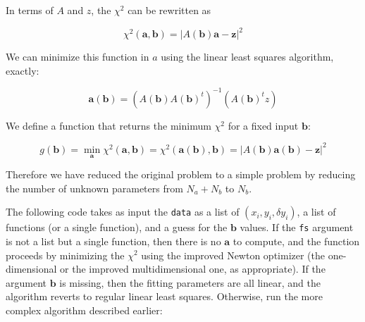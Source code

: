 \documentclass[justified,sixbynine]{tufte-book}
\def\ft{\small\tt}
\theoremstyle{plain}%
\theoremstyle{definition}
\theoremstyle{remark}
\begin{document}
\begin{fullwidth}
In terms of $A$ and $z$, the $\chi^2$ can be rewritten as

\begin{equation}
\chi^2(\mathbf{a},\mathbf{b}) = \left| A(\mathbf{b}) \mathbf{a} - \mathbf{z} \right|^2
\end{equation}

We can minimize this function in $a$ using the linear least squares algorithm, exactly:

\begin{equation}
\mathbf{a}(\mathbf{b}) = (A(\mathbf{b}) A(\mathbf{b})^t)^{-1}(A(\mathbf{b})^t z)
\end{equation}

We define a function that returns the minimum $\chi^2$ for a fixed input $\mathbf{b}$:

\begin{equation}
g(\mathbf{b}) =
\min_{\mathbf{a}}
\chi^2(\mathbf{a},\mathbf{b}) =
\chi^2(\mathbf{a}(\mathbf{b}),\mathbf{b}) = \left|
A(\mathbf{b})\mathbf{a}(\mathbf{b}) - \mathbf{z}
\right|^2
\end{equation}

Therefore we have reduced the original problem to a simple problem by reducing the number of unknown parameters from $N_a+N_b$ to $N_b$.

The following code takes as input the {\ft data} as a list of $(x_i,y_i,\delta y_i)$, a list of functions (or a single function), and a guess for the $\mathbf{b}$ values. If the {\ft fs} argument is not a list but a single function, then there is no $\mathbf{a}$ to compute, and the function proceeds by minimizing the $\chi^2$ using the improved Newton optimizer (the one-dimensional or the improved multidimensional one, as appropriate). If the argument $\mathbf{b}$ is missing, then the fitting parameters are all linear, and the algorithm reverts to regular linear least squares. Otherwise, run the more complex algorithm described earlier:


\end{fullwidth}
\end{document}
